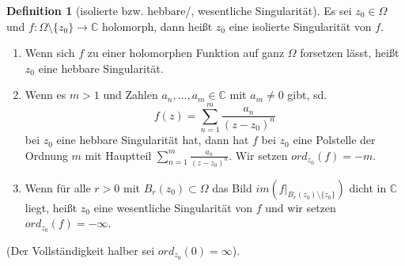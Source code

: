 \documentclass[11pt,titlepage]{article}
\theoremstyle{definition}
\newtheorem{definition}[theorem]{Definition}
\theoremstyle{remark}
\begin{document}
	\begin{definition}[isolierte bzw. hebbare/, wesentliche Singularität]
		Es sei $z_0\in\Omega$ und $f:\Omega\setminus\{z_0\}\to\mathbb{C}$ holomorph, dann heißt 
		$z_0$ eine isolierte Singularität von $f$.
		\begin{enumerate}
			\item Wenn sich $f$ zu einer holomorphen Funktion auf ganz  $\Omega$ forsetzen lässt, 
			heißt $z_0$ eine hebbare Singularität.
			\item Wenn es $m>1$ und Zahlen $a_n ,\ldots ,a_m \in\mathbb{C}$ mit $a_m \neq 0$ gibt, 
			sd. \[f(z)=\sum_{n=1}^m \frac{a_n}{(z-z_0)^n} \] bei $z_0$ eine hebbare Singularität hat, 
			dann hat $f$ bei $z_0$ eine Polstelle der Ordnung $m$ mit Hauptteil 
			$\sum_{n=1}^m \frac{a_n}{(z-z_0)^n}$. Wir setzen $ord_{z_0}(f)=-m$.
			\item Wenn für alle $r>0$ mit $B_r (z_0)\subset\Omega$ das Bild 
			$im (f|_{B_r(z_0)\setminus\{z_0\}})$ dicht in $\mathbb{C}$ liegt, heißt $z_0$ eine 
			wesentliche Singularität von $f$ und wir setzen $ord_{z_0}(f)=-\infty$.
		\end{enumerate}
		(Der Vollständigkeit halber sei $ord_{z_0}(0)=\infty$).
	\end{definition}
	
\end{document}
